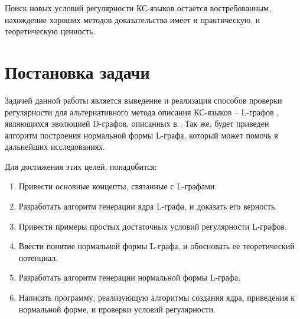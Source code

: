 Поиск новых условий регулярности КС-языков остается востребованным, нахождение
хороших методов доказательства имеет и практическую, и теоретическую ценность. 

\section{Постановка задачи}

Задачей данной работы является выведение и реализация способов проверки регулярности для альтернативного 
метода описания КС-языков -- L-графов \cite{vylitok_rostovski_o_podklassah,vylitok_sutirin_harakterizacia}, 
являющихся эволюцией D-графов, описанных в \cite{stan1}. Так же, будет приведен алгоритм построения нормальной формы
L-графа, который может помочь в дальнейших исследованиях. 

Для достижения этих целей, понадобится:

\begin{enumerate}
    \item Привести основные концепты, связанные с L-графами.
    \item Разработать алгоритм генерации ядра L-графа, и доказать его верность.
    \item Привести примеры простых достаточных условий регулярности L-графов.
    \item Ввести понятие нормальной формы L-графа, и обосновать ее теоретический потенциал.
    \item Разработать алгоритм генерации нормальной формы L-графа.
    \item Написать программу, реализующую алгоритмы создания ядра, приведения к нормальной форме, и проверки условий регулярности. 
\end{enumerate}

\clearpage
